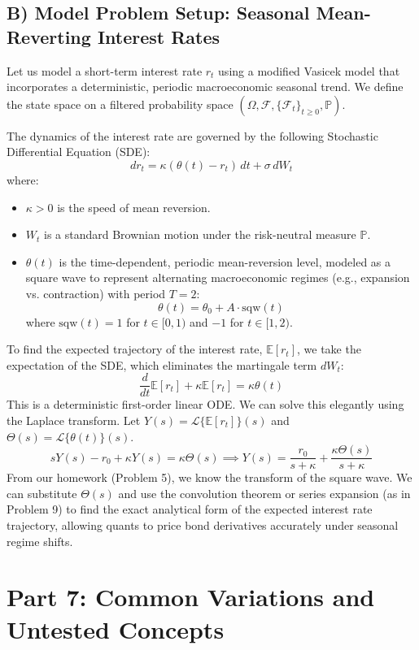\documentclass[11pt, letterpaper]{article}
\theoremstyle{definition}
\theoremstyle{remark}
\newcommand{\E}{\mathbb{E}}
\newcommand{\Prob}{\mathbb{P}}
\newcommand{\F}{\mathcal{F}}
\begin{document}
\subsection{B) Model Problem Setup: Seasonal Mean-Reverting Interest Rates}
Let us model a short-term interest rate $r_t$ using a modified Vasicek model that incorporates a deterministic, periodic macroeconomic seasonal trend. We define the state space on a filtered probability space $(\Omega, \F, \{\F_t\}_{t \ge 0}, \Prob)$.

The dynamics of the interest rate are governed by the following Stochastic Differential Equation (SDE):
\[ dr_t = \kappa(\theta(t) - r_t) \, dt + \sigma \, dW_t \]
where:
\begin{itemize}
    \item $\kappa > 0$ is the speed of mean reversion.
    \item $W_t$ is a standard Brownian motion under the risk-neutral measure $\Prob$.
    \item $\theta(t)$ is the time-dependent, periodic mean-reversion level, modeled as a square wave to represent alternating macroeconomic regimes (e.g., expansion vs. contraction) with period $T = 2$:
    \[ \theta(t) = \theta_0 + A \cdot \text{sqw}(t) \]
    where $\text{sqw}(t) = 1$ for $t \in [0, 1)$ and $-1$ for $t \in [1, 2)$.
\end{itemize}

To find the expected trajectory of the interest rate, $\E[r_t]$, we take the expectation of the SDE, which eliminates the martingale term $dW_t$:
\[ \frac{d}{dt}\E[r_t] + \kappa \E[r_t] = \kappa \theta(t) \]
This is a deterministic first-order linear ODE. We can solve this elegantly using the Laplace transform. Let $Y(s) = \mathcal{L}\{\E[r_t]\}(s)$ and $\Theta(s) = \mathcal{L}\{\theta(t)\}(s)$.
\[ sY(s) - r_0 + \kappa Y(s) = \kappa \Theta(s) \implies Y(s) = \frac{r_0}{s+\kappa} + \frac{\kappa \Theta(s)}{s+\kappa} \]
From our homework (Problem 5), we know the transform of the square wave. We can substitute $\Theta(s)$ and use the convolution theorem or series expansion (as in Problem 9) to find the exact analytical form of the expected interest rate trajectory, allowing quants to price bond derivatives accurately under seasonal regime shifts.

\newpage
\section{Part 7: Common Variations and Untested Concepts}
\end{document}
